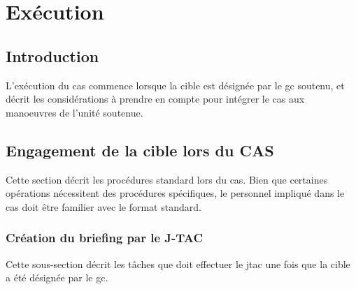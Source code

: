 
\fancyhead[L]{}
\renewcommand{\headrulewidth}{0pt}%
\newpage
\chapter{Exécution}
{\center {}}
\vfill

\newpage
\pagestyle{default}

\section{Introduction}

L'exécution du \gls{cas} commence lorsque la cible est désignée par le \gls{gc} soutenu, et décrit les considérations à prendre en compte pour intégrer le \gls{cas} aux manoeuvres de l'unité soutenue.

\section{Engagement de la cible lors du CAS}

Cette section décrit les procédures standard lors du \gls{cas}. Bien que certaines opérations nécessitent des procédures spécifiques, le personnel impliqué dans le \gls{cas} doit être familier avec le format standard.

\subsection{Création du briefing par le J-TAC}
Cette sous-section décrit les tâches que doit effectuer le \gls{jtac} une fois que la cible a été désignée par le \gls{gc}.

